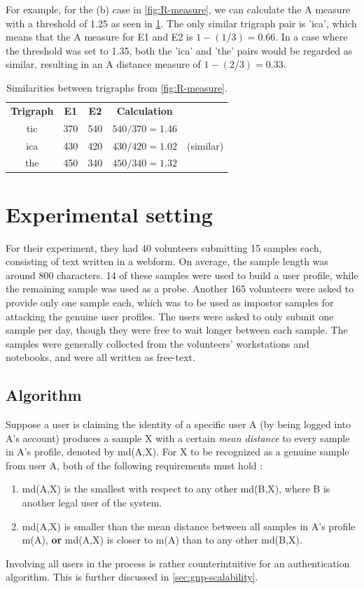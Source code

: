 \documentclass[informationsecurity]{gucmasterproject}
\begin{document}
For example, for the (b) case in \cref{fig:R-measure}, we can calculate the A measure with a threshold of 1.25 as seen in \cref{tab:gnp-similar}.
The only similar trigraph pair is 'ica', which means that the A measure for E1 and E2 is $1-(1/3)=0.66$.
In a case where the threshold was set to 1.35, both the 'ica' and 'the' pairs would be regarded as similar, resulting in an A distance measure of $1-(2/3)=0.33$.
\begin{table}[h]
\centering
\begin{tabular}{ccccc}
 \bf Trigraph & \bf E1 & \bf E2 & \bf Calculation &  \\
 tic & 370 & 540 & $540/370=1.46$ &  \\
 ica & 430 & 420 & $430/420=1.02$ & (similar) \\
 the & 450 & 340 & $450/340=1.32$ & 
\end{tabular}
\caption{Similarities between trigraphs from \cref{fig:R-measure}.}
\label{tab:gnp-similar}
\end{table}

\section{Experimental setting}
For their experiment, they had 40 volunteers submitting 15 samples each, consisting of text written in a webform. On average, the sample length was around 800 characters.
14 of these samples were used to build a user profile, while the remaining sample was used as a probe.
Another 165 volunteers were asked to provide only one sample each, which was to be used as impostor samples for attacking the genuine user profiles.
The users were asked to only submit one sample per day, though they were free to wait longer between each sample.
The samples were generally collected from the volunteers' workstations and notebooks, and were all written as free-text.

\subsection{Algorithm}
\label{sec:gnp-algorithm}
Suppose a user is claiming the identity of a specific user A (by being logged into A's account) produces a sample X with a certain \textit{mean distance} to every sample in A's profile, denoted by md(A,X).
For X to be recognized as a genuine sample from user A, both of the following requirements must hold \cite{gnp}:

\begin{enumerate}
\item md(A,X) is the smallest with respect to any other md(B,X), where B is another legal user of the system.
\item md(A,X) is smaller than the mean distance between all samples in A's profile m(A), \textbf{or} md(A,X) is closer to m(A) than to any other md(B,X).
\end{enumerate}
Involving all users in the process is rather counterintuitive for an authentication algorithm.
This is further discussed in \cref{sec:gnp-scalability}.
\end{document}

